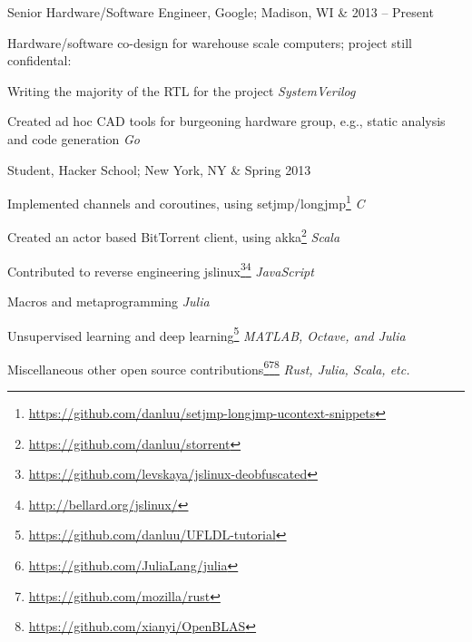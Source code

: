 \documentclass[letterpaper]{scrartcl}
\begin{document}
\begin{list1}

\item \begin{tabular1bold} Senior Hardware/Software Engineer, Google; Madison, WI & 2013 -- Present \end{tabular1bold}

  \begin{list2}
  \item Hardware/software co-design for warehouse scale computers; project still confidental:
    \begin{list3}
    \item Writing the majority of the RTL for the project \hfill \emph{SystemVerilog}
    \item Created ad hoc CAD tools for burgeoning hardware group, e.g., static analysis and code generation \hfill \emph{Go}
    \end{list3}
  \end{list2}

\item \begin{tabular1bold} Student, Hacker School; New York, NY & Spring 2013 \end{tabular1bold}

  \begin{list2}
  \item Implemented channels and coroutines, using setjmp/longjmp\footnote{\href{https://github.com/danluu/setjmp-longjmp-ucontext-snippets}{https://github.com/danluu/setjmp-longjmp-ucontext-snippets}} \hfill \emph{C} 
  \item Created an actor based BitTorrent client, using akka\footnote{\href{https://github.com/danluu/storrent}{https://github.com/danluu/storrent}}             \hfill \emph{Scala}
  \item Contributed to reverse engineering jslinux\footnote{\href{https://github.com/levskaya/jslinux-deobfuscated}{https://github.com/levskaya/jslinux-deobfuscated}}\footnote{\href{http://bellard.org/jslinux/}{http://bellard.org/jslinux/}}    \hfill \emph {JavaScript}
  \item Macros and metaprogramming \hfill \emph {Julia} %
  \item Unsupervised learning and deep learning\footnote{\href{https://github.com/danluu/UFLDL-tutorial}{https://github.com/danluu/UFLDL-tutorial}} \hfill \emph {MATLAB, Octave, and Julia} %
  \item Miscellaneous other open source contributions\footnote{\href{https://github.com/JuliaLang/julia}{https://github.com/JuliaLang/julia}}\footnote{\href{https://github.com/mozilla/rust}{https://github.com/mozilla/rust}}\footnote{\href{https://github.com/xianyi/OpenBLAS}{https://github.com/xianyi/OpenBLAS}} \hfill \emph {Rust, Julia, Scala, etc.}
  \end{list2}


\end{list1}
\end{document}
